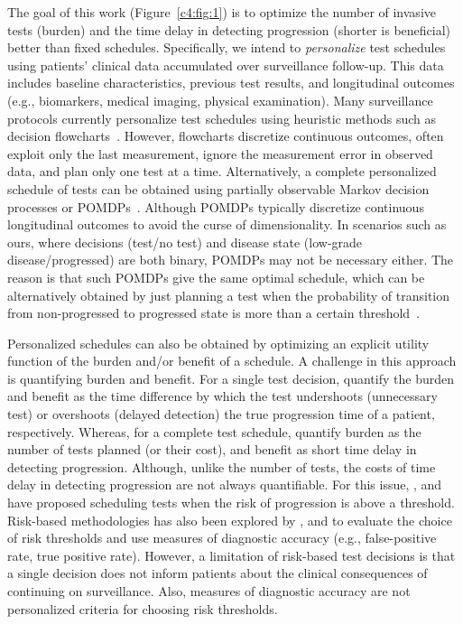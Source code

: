The goal of this work (Figure~\ref{c4:fig:1}) is to optimize the number of invasive tests (burden) and the time delay in detecting progression (shorter is beneficial) better than fixed schedules. Specifically, we intend to \emph{personalize} test schedules using patients' clinical data accumulated over surveillance follow-up. This data includes baseline characteristics, previous test results, and longitudinal outcomes (e.g., biomarkers, medical imaging, physical examination). Many surveillance protocols currently personalize test schedules using heuristic methods such as decision flowcharts~\citep{bokhorst2015compliance,weusten2017endoscopic}. However, flowcharts discretize continuous outcomes, often exploit only the last measurement, ignore the measurement error in observed data, and plan only one test at a time. Alternatively, a complete personalized schedule of tests can be obtained using partially observable Markov decision processes or POMDPs~\citep{alagoz2010operations,steimle2017markov}. Although POMDPs typically discretize continuous longitudinal outcomes to avoid the curse of dimensionality. In scenarios such as ours, where decisions (test/no test) and disease state (low-grade disease/progressed) are both binary, POMDPs may not be necessary either. The reason is that such POMDPs give the same optimal schedule, which can be alternatively obtained by just planning a test when the probability of transition from non-progressed to progressed state is more than a certain threshold~\cite[see][Equation~1]{vickers2006decision}. 

Personalized schedules can also be obtained by optimizing an explicit utility function of the burden and/or benefit of a schedule. A challenge in this approach is quantifying burden and benefit. For a single test decision, \citet{tomer2019personalizedbiometrics} quantify the burden and benefit as the time difference by which the test undershoots (unnecessary test) or overshoots (delayed detection) the true progression time of a patient, respectively. Whereas, for a complete test schedule, \citet{bebu2017optimal} quantify burden as the number of tests planned (or their cost), and benefit as short time delay in detecting progression. Although, unlike the number of tests, the costs of time delay in detecting progression are not always quantifiable. For this issue, \citet{bebu2017optimal}, and \citet{vickers2006decision} have proposed scheduling tests when the risk of progression is above a threshold. Risk-based methodologies has also been explored by \citet{rizopoulos2015personalized}, and to evaluate the choice of risk thresholds \citet{wang2019learning} and \citet{tomer2019personalized} use measures of diagnostic accuracy (e.g., false-positive rate, true positive rate). However, a limitation of risk-based test decisions is that a single decision does not inform patients about the clinical consequences of continuing on surveillance. Also, measures of diagnostic accuracy are not personalized criteria for choosing risk thresholds.

